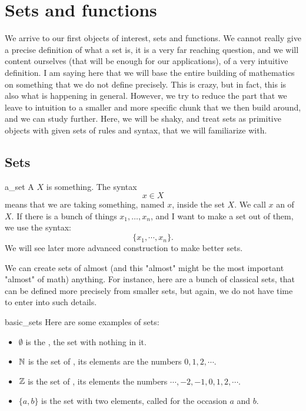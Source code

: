 \section{Sets and functions}

We arrive to our first objects of interest, sets and functions. We cannot really give a precise definition of what a set is, it is a very far reaching question, and we will content ourselves (that will be enough for our applications), of a very intuitive definition. I am saying here that we will base the entire building of mathematics on something that we do not define precisely. This is crazy, but in fact, this is also what is happening in general. However, we try to reduce the part that we leave to intuition to a smaller and more specific chunk that we then build around, and we can study further. Here, we will be shaky, and treat sets as primitive objects with given sets of rules and syntax, that we will familiarize with.

\subsection{Sets}

\begin{cdef}{}{a_set}
    A  \( X \) is something. The syntax
    \begin{equation*}
        x \in X
    \end{equation*}
    means that we are taking something, named \( x \), inside the set \( X \). We call \( x \) an  of \( X \). If there is a bunch of things \( x_1, \dots, x_n \), and I want to make a set out of them, we use the syntax:
    \begin{equation*}
        \{ x_1, \cdots, x_n \}.
    \end{equation*}
    We will see later more advanced construction to make better sets.
\end{cdef}

We can create sets of almost (and this "almost" might be the most important "almost" of math) anything. For instance, here are a bunch of classical sets, that can be defined more precisely from smaller sets, but again, we do not have time to enter into such details.

\begin{cexp}{}{basic_sets}
    Here are some examples of sets:
    \begin{itemize}
        \item \( \emptyset \) is the , the set with nothing in it. 
        \item \( \mathbb{N} \) is the set of , its elements are the numbers \( 0, 1, 2, \cdots \).
        \item \( \mathbb{Z} \) is the set of , its elements the numbers \( \cdots, -2, -1, 0, 1, 2, \cdots \).
        \item \( \{ a, b \} \) is the set with two elements, called for the occasion \( a \) and \( b \).
    \end{itemize}
\end{cexp}

